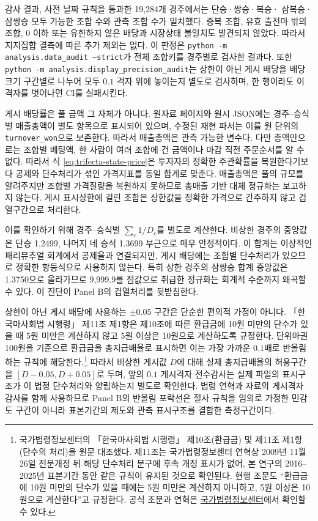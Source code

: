 감사 결과, 사전 날짜 규칙을 통과한 19,284개 경주에서는 단승·쌍승·복승·
삼복승·삼쌍승 모두 가능한 조합 수와 관측 조합 수가 일치했다. 중복 조합,
유효 출전마 밖의 조합, 0 이하 또는 유한하지 않은 배당과 시장상태 불일치도
발견되지 않았다. 따라서 지지집합 결측에 따른 추가 제외는 없다. 이 판정은
\texttt{python -m analysis.data\_audit --strict}가 전체 조합키를 경주별로
검사한 결과다. 또한 \texttt{python -m analysis.display\_precision\_audit}는
상한이 아닌 게시 배당을 배당 크기 구간별로 나누어 모두 $0.1$ 격자 위에 놓이는지
별도로 검사하며, 한 행이라도 이 격자를 벗어나면 CI를 실패시킨다.



게시 배당률은 풀 금액 그 자체가 아니다. 원자료 페이지와 원시 JSON에는
경주--승식별 매출총액이 별도 항목으로 표시되어 있으며, 수정된 재현 파서는 이를
원 단위의 \texttt{turnover\_won}으로 보존한다. 따라서 매출총액은 관측 가능한
변수다. 다만 총액만으로는 조합별 베팅액, 한 사람이 여러 조합에 건 금액이나
마감 직전 주문순서를 알 수 없다. 따라서 식
\eqref{eq:trifecta-state-price}은 투자자의 정확한 주관확률을 복원한다기보다
공제와 단수처리가 섞인 가격지표를 동일 합계로 맞춘다. 매출총액은 풀의 규모를
알려주지만 조합별 가격질량을 복원하지 못하므로 총매출 기반 대체 정규화는
보고하지 않는다. 게시 표시상한에
걸린 조합은 상한값을 정확한 가격으로 간주하지 않고 검열구간으로 처리한다.

이를 확인하기 위해 경주--승식별 $\sum_c1/D_c$를 별도로 계산한다. 비상한
경주의 중앙값은 단승 1.2499, 나머지 네 승식 1.3699 부근으로 매우 안정적이다.
이 합계는 이상적인 패리뮤추얼 회계에서 공제율과 연결되지만, 게시 배당에는
조합별 단수처리가 있으므로 정확한 항등식으로 사용하지 않는다. 특히 상한 경주의
삼쌍승 합계 중앙값은 1.3750으로 올라가므로 9,999.9를 점값으로 취급한 정규화는
회계적 수준까지 왜곡할 수 있다. 이 진단이 Panel B의 검열처리를 뒷받침한다.

상한이 아닌 게시 배당에 사용하는 $\pm0.05$ 구간은 단순한 편의적 가정이 아니다.
「한국마사회법 시행령」 제11조 제1항은 제10조에 따른 환급금에 10원 미만의
단수가 있을 때 5원 미만은 계산하지 않고 5원 이상은 10원으로 계산하도록
규정한다. 단위마권 100원을 기준으로 환급금을 총지급배율로 표시하면 이는 가장
가까운 $0.1$배로 반올림하는 규칙에 해당한다.\footnote{국가법령정보센터의
「한국마사회법 시행령」 제10조(환급금) 및 제11조 제1항(단수의 처리)을 원문
대조했다. 제11조는 국가법령정보센터 연혁상 2009년 11월 26일 전문개정 뒤 해당
단수처리 문구에 후속 개정 표시가 없어, 본 연구의 2016--2025년 표본기간 동안
같은 규칙이 유지된 것으로 확인된다. 현행 조문도 ``환급금에 10원 미만의 단수가
있을 때에는 5원 미만은 계산하지 아니하고, 5원 이상은 10원으로 계산한다''고
규정한다. 공식 조문과 연혁은
\href{https://www.law.go.kr/LSW/lsInfoP.do?lsiSeq=268449}{국가법령정보센터}에서
확인할 수 있다.} 따라서 비상한 게시값 $D$에 대해 실제 총지급배율의 허용구간을
$[D-0.05,D+0.05]$로 두며, 앞의 $0.1$ 게시격자 전수감사는 실제 파일의 표시구조가
이 법정 단수처리와 양립하는지 별도로 확인한다. 법령 연혁과 자료의 게시격자
감사를 함께 사용하므로 Panel B의 반올림 포락선은 절사 규칙을 임의로 가정한
민감도 구간이 아니라 표본기간의 제도와 관측 표시구조를 결합한 측정구간이다.

